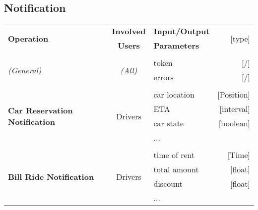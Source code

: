 	
\subsection{Notification}
	\begin{center}
		\begin{tabular}{ l | c | l   r }
			\multirow{2}{*}{\textbf{Operation}} & \textbf{Involved} & \textbf{Input/Output} & \multirow{2}{*}{[type]}\\
			& \textbf{Users} & \textbf{Parameters} & \\ [1.5ex]
			\hline\hline\\
			
			\multirow{2}{*}{\textit{(General)}}
				& \multirow{2}{*}{\textit{(All)}}
					&	token & [/]\\
					&&	errors & [/]\\ [1.5ex]
			\hline\\
			
			\multirow{4}{*}{\textbf{Car Reservation Notification}}
				& \multirow{4}{*}{Drivers}
					&	car location & [Position]\\
					&&	ETA & [interval]\\
					&&	car state & [boolean]\\
					&&	... & \\ [1.5ex]
			\hline\\
			
			\multirow{4}{*}{\textbf{Bill Ride Notification}}
				& \multirow{4}{*}{Drivers}
					&	time of rent & [Time]\\
					&&	total amount & [float]\\
					&&	discount & [float]\\
					&&	... & \\ [1.5ex]
			\hline
		\end{tabular}
	\end{center}


